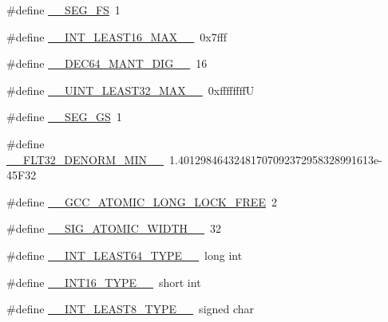 \begin{DoxyCompactItemize}
\item 
\#define \hyperlink{cmake-build-debug_2babel__client__autogen_2moc__predefs_8h_a0dc6b3d1554b0fa068323b6e5b614889}{\+\_\+\+\_\+\+S\+E\+G\+\_\+\+FS}~1
\item 
\#define \hyperlink{cmake-build-debug_2babel__client__autogen_2moc__predefs_8h_a4f3694eafdad4edb2bfe114a06553dec}{\+\_\+\+\_\+\+I\+N\+T\+\_\+\+L\+E\+A\+S\+T16\+\_\+\+M\+A\+X\+\_\+\+\_\+}~0x7fff
\item 
\#define \hyperlink{cmake-build-debug_2babel__client__autogen_2moc__predefs_8h_a61c258ffad919b338b83e1401265f671}{\+\_\+\+\_\+\+D\+E\+C64\+\_\+\+M\+A\+N\+T\+\_\+\+D\+I\+G\+\_\+\+\_\+}~16
\item 
\#define \hyperlink{cmake-build-debug_2babel__client__autogen_2moc__predefs_8h_a281ab632befbb2d5567ff114e2fa18f9}{\+\_\+\+\_\+\+U\+I\+N\+T\+\_\+\+L\+E\+A\+S\+T32\+\_\+\+M\+A\+X\+\_\+\+\_\+}~0xffffffffU
\item 
\#define \hyperlink{cmake-build-debug_2babel__client__autogen_2moc__predefs_8h_a69fac94363782975c5fd38b2b85773c1}{\+\_\+\+\_\+\+S\+E\+G\+\_\+\+GS}~1
\item 
\#define \hyperlink{cmake-build-debug_2babel__client__autogen_2moc__predefs_8h_ae9559701fd39a0fbd0dc1a30a4cda0dd}{\+\_\+\+\_\+\+F\+L\+T32\+\_\+\+D\+E\+N\+O\+R\+M\+\_\+\+M\+I\+N\+\_\+\+\_\+}~1.\+40129846432481707092372958328991613e-\/45\+F32
\item 
\#define \hyperlink{cmake-build-debug_2babel__client__autogen_2moc__predefs_8h_af6547beba0a34ed6bd6453f1220a97ca}{\+\_\+\+\_\+\+G\+C\+C\+\_\+\+A\+T\+O\+M\+I\+C\+\_\+\+L\+O\+N\+G\+\_\+\+L\+O\+C\+K\+\_\+\+F\+R\+EE}~2
\item 
\#define \hyperlink{cmake-build-debug_2babel__client__autogen_2moc__predefs_8h_a768834e55cd5d1c30d24b0dbc83563cc}{\+\_\+\+\_\+\+S\+I\+G\+\_\+\+A\+T\+O\+M\+I\+C\+\_\+\+W\+I\+D\+T\+H\+\_\+\+\_\+}~32
\item 
\#define \hyperlink{cmake-build-debug_2babel__client__autogen_2moc__predefs_8h_aadf1477c4b8076c939fb4fdeca6f4b8e}{\+\_\+\+\_\+\+I\+N\+T\+\_\+\+L\+E\+A\+S\+T64\+\_\+\+T\+Y\+P\+E\+\_\+\+\_\+}~long int
\item 
\#define \hyperlink{cmake-build-debug_2babel__client__autogen_2moc__predefs_8h_a6770e92cfa87964cfcf358a6358f5347}{\+\_\+\+\_\+\+I\+N\+T16\+\_\+\+T\+Y\+P\+E\+\_\+\+\_\+}~short int
\item 
\#define \hyperlink{cmake-build-debug_2babel__client__autogen_2moc__predefs_8h_a1801bfbb7ab3b0ff09a48c3d78bd97e2}{\+\_\+\+\_\+\+I\+N\+T\+\_\+\+L\+E\+A\+S\+T8\+\_\+\+T\+Y\+P\+E\+\_\+\+\_\+}~signed char

\end{DoxyCompactItemize}
